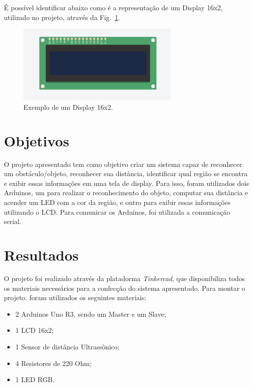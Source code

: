 \documentclass[conference]{IEEEtran}
\begin{document}
É possível identificar abaixo como é a representação de um Display 16x2, utilizado no projeto, através
da Fig.~\ref{fig}.

\begin{figure}[htbp]
    \centerline{
        \includegraphics[width=8cm]{images/Display.png}
        }
    \caption{Exemplo de um Display 16x2.}
    \label{fig}
    \end{figure}

\section{Objetivos}

    O projeto apresentado tem como objetivo criar um sistema capaz de reconhecer um obstáculo/objeto,
reconhecer sua distância, identificar qual região se encontra e exibir essas informações em uma tela de 
display. Para isso, foram utilizados dois Arduinos, um para realizar o reconhecimento do objeto, computar
sua distância e acender um LED com a cor da região, e outro para exibir essas informações utilizando o
LCD. Para comunicar os Arduinos, foi utilizada a comunicação serial.

\section{Resultados}

    O projeto foi realizado através da platadorma \emph{Tinkercad}, que disponibiliza todos os materiais
necessários para a confecção do sistema apresentado. Para montar o projeto. foram utilizados os seguintes
materiais:
    \begin{itemize}
        \item 2 Arduinos Uno R3, sendo um Master e um Slave;
        \item 1 LCD 16x2;
        \item 1 Sensor de distância Ultrassônico;
        \item 4 Resistores de 220 Ohm;
        \item 1 LED RGB.
    \end{itemize}
\end{document}
